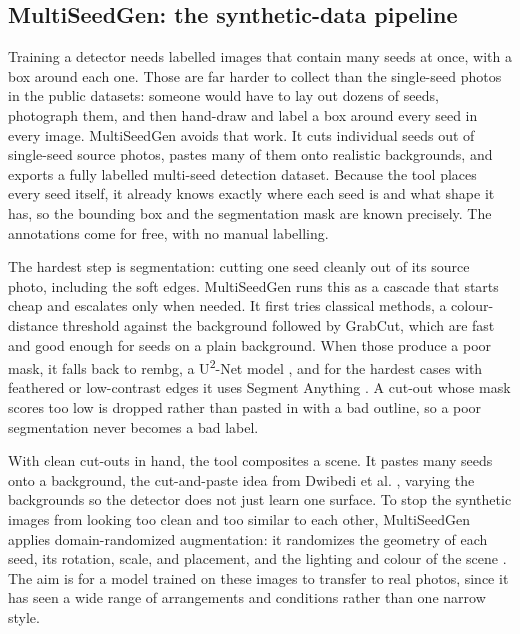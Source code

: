\subsection{MultiSeedGen: the synthetic-data pipeline}

Training a detector needs labelled images that contain many seeds at once, with a
box around each one. Those are far harder to collect than the single-seed photos
in the public datasets: someone would have to lay out dozens of seeds, photograph
them, and then hand-draw and label a box around every seed in every image.
MultiSeedGen avoids that work. It cuts individual seeds out of single-seed
source photos, pastes many of them onto realistic backgrounds, and exports a
fully labelled multi-seed detection dataset. Because the tool places every seed
itself, it already knows exactly where each seed is and what shape it has, so the
bounding box and the segmentation mask are known precisely. The annotations come
for free, with no manual labelling.

The hardest step is segmentation: cutting one seed cleanly out of its source
photo, including the soft edges. MultiSeedGen runs this as a cascade that starts
cheap and escalates only when needed. It first tries classical methods, a
colour-distance threshold against the background followed by GrabCut, which are
fast and good enough for seeds on a plain background. When those produce a poor
mask, it falls back to rembg, a U\textsuperscript{2}-Net model
\cite{qin2020u2net}, and for the hardest cases with feathered or low-contrast
edges it uses Segment Anything \cite{kirillov2023sam}. A cut-out whose mask
scores too low is dropped rather than pasted in with a bad outline, so a poor
segmentation never becomes a bad label.

With clean cut-outs in hand, the tool composites a scene. It pastes many seeds
onto a background, the cut-and-paste idea from Dwibedi et al.
\cite{dwibedi2017cutpaste}, varying the backgrounds so the detector does not just
learn one surface. To stop the synthetic images from looking too clean and too
similar to each other, MultiSeedGen applies domain-randomized augmentation: it
randomizes the geometry of each seed, its rotation, scale, and placement, and the lighting and colour of the scene \cite{tobin2017domainrand,
shorten2019augmentation, buslaev2020albumentations}. The aim is for a model
trained on these images to transfer to real photos, since it has seen a wide
range of arrangements and conditions rather than one narrow style.

